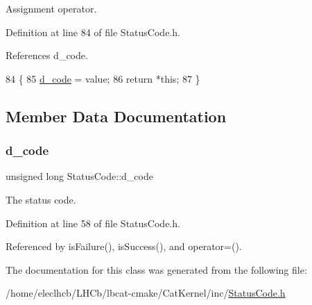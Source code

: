 Assignment operator. 



Definition at line 84 of file Status\+Code.\+h.



References d\+\_\+code.


\begin{DoxyCode}
84                                                               \{
85   \hyperlink{classStatusCode_aff37ebcb323b897044b42d303cf72d93}{d\_code} = value;
86   \textcolor{keywordflow}{return} *\textcolor{keyword}{this};
87 \}
\end{DoxyCode}


\subsection{Member Data Documentation}
\mbox{\label{classStatusCode_aff37ebcb323b897044b42d303cf72d93}} 
\subsubsection{\texorpdfstring{d\+\_\+code}{d\_code}}
{\footnotesize\ttfamily unsigned long Status\+Code\+::d\+\_\+code\hspace{0.3cm}{\ttfamily [protected]}}



The status code. 



Definition at line 58 of file Status\+Code.\+h.



Referenced by is\+Failure(), is\+Success(), and operator=().



The documentation for this class was generated from the following file\+:\begin{DoxyCompactItemize}
\item 
/home/eleclhcb/\+L\+H\+Cb/lbcat-\/cmake/\+Cat\+Kernel/inc/\hyperlink{StatusCode_8h}{Status\+Code.\+h}\end{DoxyCompactItemize}
